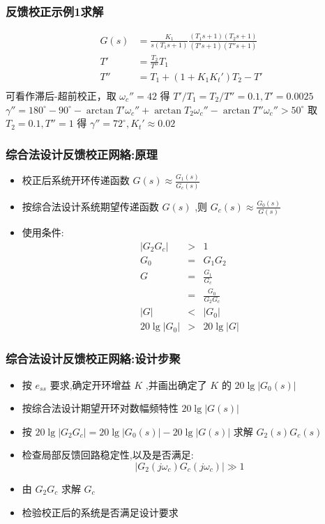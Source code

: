 \documentclass[table]{beamer}
\begin{document}
\begin{frame}
\frametitle{反馈校正示例1求解}
\label{sec-6-3-3}

\begin{align*}
G(s) &=\frac{K_1}{s(T_1s+1)}\frac{(T_1s+1)(T_2s+1)}{(T's+1)(T''s+1)}\\
T' &=\frac{T_2}{T''}T_1 \\
T'' &= T_1+(1+K_1K_t')T_2-T' \\
\end{align*}
可看作滞后-超前校正，取 $\omega_c''=42$ 得 $T'/T_1=T_2/T''=0.1,T'=0.0025$
$\gamma''=180^{\circ}-90^{\circ}-\arctan T'\omega_c''+\arctan T_2\omega_c''-\arctan T''\omega_c''>50^{\circ}$ 取 $T_2=0.1,T''=1$ 得 $\gamma''=72^{\circ},K_t'\approx 0.02$
\end{frame}
\begin{frame}
\frametitle{综合法设计反馈校正网絡:原理}
\label{sec-6-3-4}

\begin{itemize}
\item 校正后系统开环传递函数  $G(s)\approx\frac{G_1(s)}{G_c(s)}$
\item <2->按综合法设计系统期望传递函数  $G(s)$  ,则 $G_c(s)\approx\frac{G_0(s)}{G(s)}$
\item <3->使用条件:
      \begin{eqnarray*}
       |G_2 G_c| & > & 1 \\
       G_0 & = & G_1 G_2 \\
       G &=& \frac{G_1}{G_c}\\
	 &=& \frac{G_0}{G_2 G_c} \\
       |G| & <& | G_{0} | \\ 
       20\lg|G_0|&>&20\lg|G|
      \end{eqnarray*}
\end{itemize}
\end{frame}
\begin{frame}
\frametitle{综合法设计反馈校正网絡:设计步聚}
\label{sec-6-3-5}

\begin{itemize}
\item 按  $e_{ss}$  要求,确定开环增益 $K$  ,并画出确定了 $K$  的 $20\lg|G_0(s)|$
\item 按综合法设计期望开环对数幅频特性 $20\lg|G(s)|$
\item <2->按  $20\lg|G_2 G_c|=20\lg|G_0(s)|-20\lg |G(s)|$  求解  $G_2(s)G_c(s)$
\item <3->检查局部反馈回路稳定性,以及是否满足:  
	    \[|G_2(j\omega_c)G_c(j\omega_c)|\gg 1\]
\item <4->由 $G_2G_c$ 求解 $G_c$
\item <5->检验校正后的系统是否满足设计要求
\end{itemize}
\end{frame}
\end{document}
